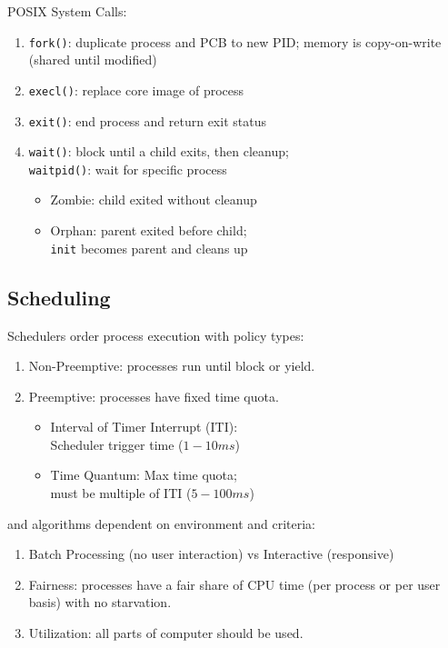 \documentclass[12pt, a4paper]{article}
\begin{document}
\begin{multicols*}{3}
POSIX System Calls:
\begin{enumerate}[\roman*.]
  \item \lstinline|fork()|: duplicate process and PCB to new PID; memory is copy-on-write (shared until modified)
  \item \lstinline|execl()|: replace core image of process 
  \item \lstinline|exit()|: end process and return exit status
  \item \lstinline|wait()|: block until a child exits, then cleanup;\\\lstinline|waitpid()|: wait for specific process\\\vspace{2pt}
    \begin{itemize}[leftmargin=*]
    \item Zombie: child exited without cleanup 
    \item Orphan: parent exited before child;\\ \lstinline|init| becomes parent and cleans up
  \end{itemize}
\end{enumerate}
\vspace{-1em}
\colbreak
\subsection{Scheduling}
Schedulers order process execution with policy types: 
\begin{enumerate}[\roman*.]
  \item Non-Preemptive: processes run until block or yield.
  \item Preemptive: processes have fixed time quota.
  \vspace{2pt}
  \begin{itemize}[leftmargin=*]
    \item Interval of Timer Interrupt (ITI):\\Scheduler trigger time ($1-10ms$)
    \item Time Quantum: Max time quota;\\must be multiple of ITI ($5-100ms$)
  \end{itemize}
\end{enumerate}
and algorithms dependent on environment and criteria:
\begin{enumerate}[\roman*.]
  \item Batch Processing (no user interaction) vs Interactive (responsive)
  \item Fairness: processes have a fair share of CPU time (per process or per user basis) with no starvation.
  \item Utilization: all parts of computer should be used.
\end{enumerate}


\end{multicols*}
\end{document}
